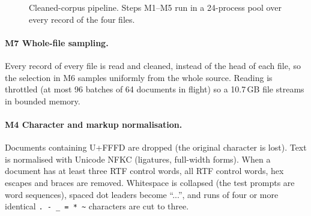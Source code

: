 \documentclass[11pt,a4paper]{article}
\newcommand{\code}[1]{\texttt{\small #1}}
\begin{document}
\begin{figure}[H]\centering
{}
\caption{Cleaned-corpus pipeline. Steps M1--M5 run in a 24-process pool over every record of the four files.}
\label{fig:pipeline}\end{figure}

\paragraph{M7 Whole-file sampling.} Every record of every file is read and cleaned, instead of the head of
each file, so the selection in M6 samples uniformly from the whole source.  Reading is throttled (at most 96
batches of 64 documents in flight) so a 10.7\,GB file streams in bounded memory.

\paragraph{M4 Character and markup normalisation.} Documents containing U+FFFD are dropped (the original
character is lost).  Text is normalised with Unicode NFKC (ligatures, full-width forms).  When a document has
at least three RTF control words, all RTF control words, hex escapes and braces are removed.  Whitespace is
collapsed (the test prompts are word sequences), spaced dot leaders become ``...'', and runs of four or more
identical \code{. - \_ = * \~{}} characters are cut to three.
\end{document}
